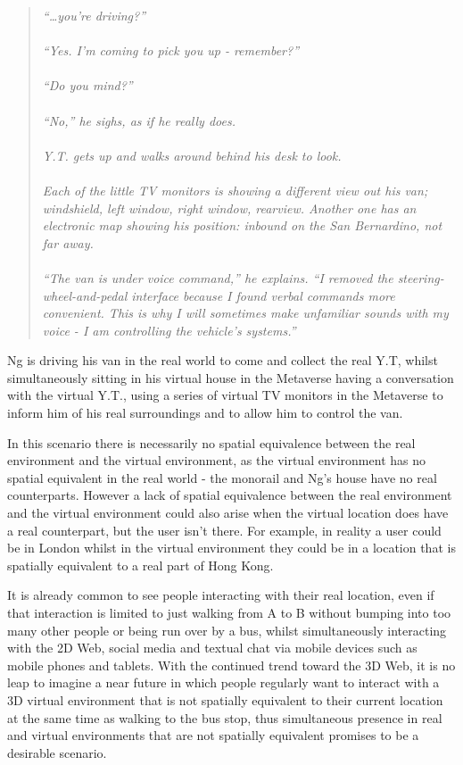 \begin{quote}
\textit{``\ldots you're driving?''}
\\
\\
\textit{``Yes. I'm coming to pick you up - remember?''}
\\
\\
\textit{``Do you mind?''}
\\
\\
\textit{``No,'' he sighs, as if he really does.}
\\
\\
\textit{Y.T. gets up and walks around behind his desk to look.}
\\
\\
\textit{Each of the little TV monitors is showing a different view out his van; windshield,  left  window,  right  window, rearview.  Another  one  has  an electronic map  showing his position: inbound on the San Bernardino, not far
away.}
\\
\\
\textit{``The  van  is  under  voice  command,''  he  explains.  ``I  removed  the steering-wheel-and-pedal  interface because  I found  verbal  commands  more convenient. This  is why I will  sometimes  make unfamiliar  sounds with  my voice - I am controlling the vehicle's systems.''}
\end{quote}

Ng is driving his van in the real world to come and collect the real Y.T, whilst simultaneously sitting in his virtual house in the Metaverse having a conversation with the virtual Y.T., using a series of virtual TV monitors in the Metaverse to inform him of his real surroundings and to allow him to control the van.

In this scenario there is necessarily no spatial equivalence between the real environment and the virtual environment, as the virtual environment has no spatial equivalent in the real world - the monorail and Ng's house have no real counterparts. However a lack of spatial equivalence between the real environment and the virtual environment could also arise when the virtual location does have a real counterpart, but the user isn't there. For example, in reality a user could be in London whilst in the virtual environment they could be in a location that is spatially equivalent to a real part of Hong Kong.

It is already common to see people interacting with their real location, even if that interaction is limited to just walking from A to B without bumping into too many other people or being run over by a bus, whilst simultaneously interacting with the 2D Web, social media and textual chat via mobile devices such as mobile phones and tablets. With the continued trend toward the 3D Web, it is no leap to imagine a near future in which people regularly want to interact with a 3D virtual environment that is not spatially equivalent to their current location at the same time as walking to the bus stop, thus simultaneous presence in real and virtual environments that are not spatially equivalent promises to be a desirable scenario.